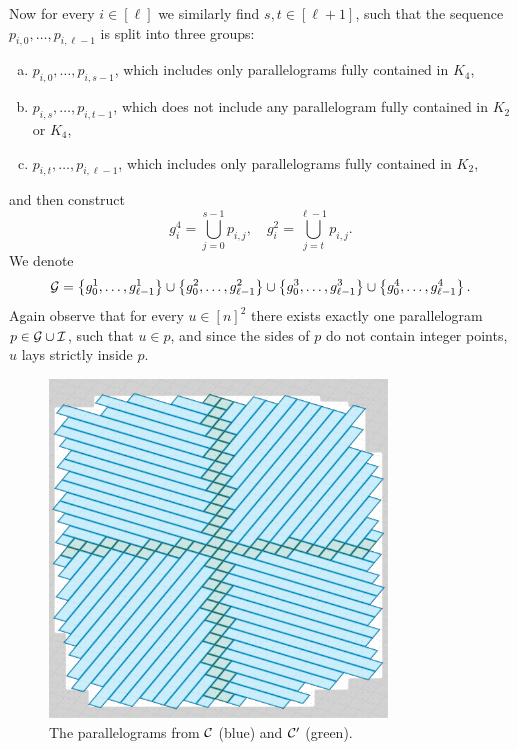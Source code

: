 \documentclass[11pt, letterpaper]{article}
\theoremstyle{plain}
\theoremstyle{definition}
\theoremstyle{remark}
\newcommand{\set}[1]{\left\lbrace #1 \right\rbrace}
\begin{document}
Now for every $i \in [\ell]$ we similarly find $s, t \in [\ell + 1]$, such that the sequence $p_{i, 0}, \dots, p_{i, \ell - 1}$ is split into three groups:
\begin{enumerate}[a)]
	\item $p_{i, 0}, \dots, p_{i, s - 1}$, which includes only parallelograms fully contained in $K_4$,
	\item $p_{i, s}, \dots, p_{i, t - 1}$, which does not include any parallelogram fully contained in $K_2$ or $K_4$,
	\item $p_{i, t}, \dots, p_{i, \ell - 1}$, which includes only parallelograms fully contained in $K_2$,
\end{enumerate}
and then construct
\[
g^4_i = \bigcup_{j = 0}^{s - 1} p_{i, j}, \quad 
g^2_i = \bigcup_{j = t}^{\ell - 1} p_{i, j}.
\]
We denote
\[
\G = \set{g^1_0, \dots, g^1_{\ell - 1}}  
\cup \set{g^2_0, \dots, g^2_{\ell - 1}}
\cup \set{g^3_0, \dots, g^3_{\ell - 1}}
\cup \set{g^4_0, \dots, g^4_{\ell - 1}}.
\]
Again observe that for every $u \in [n]^2$ there exists exactly one parallelogram $p \in \mathcal{G} \cup \mathcal{I}$, such that $u \in p$, and since the sides of $p$ do not contain integer points, $u$ lays strictly inside $p$.

\begin{figure}[!t]
	\begin{center}
		\includegraphics[width=0.8\textwidth]{drawings/text_decomposition}
	\end{center}
	\caption{The parallelograms from $\mathcal{C}$ (blue) and $\mathcal{C}'$ (green).}
	\label{figure:text_decomposition}
\end{figure}
\end{document}
